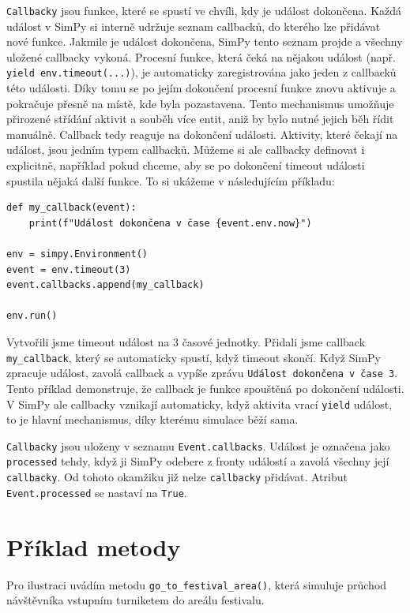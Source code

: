 \documentclass[12pt,a4paper]{article}
\begin{document}
\texttt{Callbacky} jsou funkce, které se spustí ve chvíli, kdy je událost dokončena. Každá událost v SimPy si interně udržuje seznam callbacků, do kterého lze přidávat nové funkce. Jakmile je událost dokončena, SimPy tento seznam projde a všechny uložené callbacky vykoná. Procesní funkce, která čeká na nějakou událost (např. \texttt{yield env.timeout(...)}), je automaticky zaregistrována jako jeden z callbacků této události. Díky tomu se po jejím dokončení procesní funkce znovu aktivuje a pokračuje přesně na místě, kde byla pozastavena. Tento mechanismus umožňuje přirozené střídání aktivit a souběh více entit, aniž by bylo nutné jejich běh řídit manuálně. Callback tedy reaguje na dokončení události. Aktivity, které čekají na událost, jsou jedním typem callbacků. Můžeme si ale callbacky definovat i explicitně, například pokud chceme, aby se po dokončení timeout události spustila nějaká další funkce. To si ukážeme v následujícím příkladu:

 \begin{verbatim} 
def my_callback(event):
    print(f"Událost dokončena v čase {event.env.now}")

env = simpy.Environment()
event = env.timeout(3)
event.callbacks.append(my_callback)

env.run()
\end{verbatim}

Vytvořili jsme timeout událost na 3 časové jednotky. Přidali jsme callback \texttt{my\_callback}, který se automaticky spustí, když timeout skončí. Když SimPy zpracuje událost, zavolá callback a vypíše zprávu \texttt{Událost dokončena v čase 3}. Tento příklad demonstruje, že callback je funkce spouštěná po dokončení události. V SimPy ale callbacky vznikají automaticky, když aktivita vrací \texttt{yield} událost, to je hlavní mechanismus, díky kterému simulace běží sama.


\texttt{Callbacky} jsou uloženy v seznamu \texttt{Event.callbacks}. 
Událost je označena jako \texttt{processed} tehdy, když ji SimPy odebere z fronty událostí a zavolá všechny její \texttt{callbacky}. Od tohoto okamžiku již nelze \texttt{callbacky} přidávat. Atribut \texttt{Event.processed} se nastaví na \texttt{True}.


\newpage

\section{Příklad metody}
Pro ilustraci uvádím metodu \texttt{go\_to\_festival\_area()}, která simuluje průchod návštěvníka vstupním turniketem do areálu festivalu.
\end{document}
